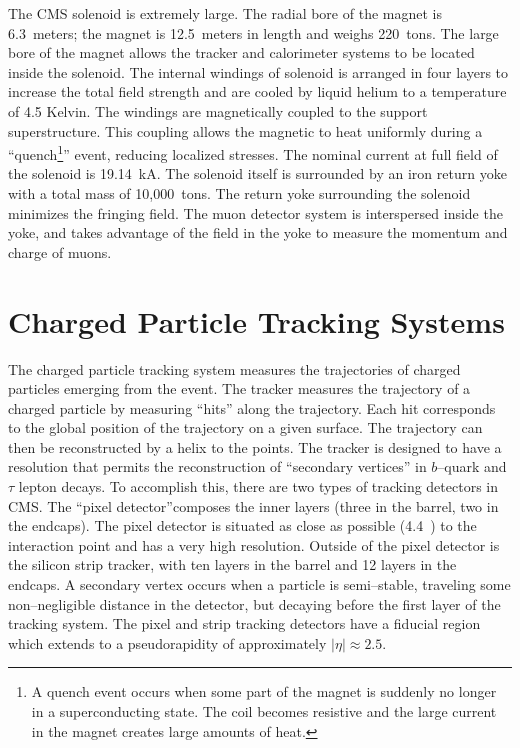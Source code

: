 The CMS solenoid is extremely large.  The radial bore of the magnet is
6.3~meters; the magnet is 12.5~meters in length and weighs 220~tons.  The large
bore of the magnet allows the tracker and calorimeter systems to be located
inside the solenoid.  The internal windings of solenoid is arranged in four
layers to increase the total field strength and are cooled by liquid helium to
a temperature of 4.5 Kelvin.  The windings are magnetically
coupled to the support superstructure.  This coupling allows the magnetic to
heat uniformly during a ``quench\footnote{A quench event occurs when some part
of the magnet is suddenly no longer in a superconducting state.  The coil
becomes resistive and the large current in the magnet creates large amounts of
heat.}'' event, reducing localized stresses.  The
nominal current at full field of the solenoid is 19.14~kA.  The solenoid itself
is surrounded by an iron return yoke with a total mass of 10,000~tons.  The
return yoke surrounding the solenoid minimizes the fringing field.  The muon
detector system is interspersed inside the yoke, and takes advantage of the
field in the yoke to measure the momentum and charge of muons.
%
\section{Charged Particle Tracking Systems}
\label{sec:Tracker}

The charged particle tracking system measures the trajectories of charged
particles emerging from the event.  The tracker measures the trajectory of a
charged particle by measuring ``hits'' along the trajectory.  Each hit
corresponds to the global position of the trajectory on a given surface.  The
trajectory can then be reconstructed by a helix to the points.  The tracker is
designed to have a resolution that permits the reconstruction of ``secondary
vertices'' in $b$--quark and $\tau$ lepton decays.  To accomplish this, there
are two types of tracking detectors in CMS\@.  The ``pixel detector''composes
the inner layers (three in the barrel, two in the endcaps).  The pixel detector
is  situated as close as possible (4.4~\cm) to the interaction point and has a
very high resolution. Outside of the pixel detector is the silicon strip
tracker, with ten layers in the barrel and 12 layers in the endcaps.  A
secondary vertex occurs when a particle is semi--stable, traveling some
non--negligible distance in the detector, but decaying before the first layer of
the tracking system.  The pixel and strip tracking detectors have a fiducial
region which extends to a pseudorapidity of approximately $|\eta| \approx 2.5$.

